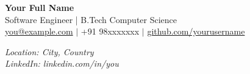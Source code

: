 \documentclass[11pt]{article}
\begin{document}
\thispagestyle{empty}

\begin{minipage}[t]{0.68\textwidth}
  {\LARGE\bfseries Your Full Name}\\[4pt]
  {\small Software Engineer \quad | \quad B.Tech Computer Science}\\
  \vspace{6pt}
  \small
  \href{mailto:you@example.com}{you@example.com} \quad $\vert$ \quad +91 98xxxxxxx \quad $\vert$ \quad \href{https://github.com/yourusername}{github.com/yourusername}
\end{minipage}
\begin{minipage}[t]{0.30\textwidth}
  \raggedleft
  \vspace{-6pt}
  {\small \textit{Location: City, Country}}\\
  {\small \textit{LinkedIn: linkedin.com/in/you}}
\end{minipage}

\vspace{8pt}
\end{document}
